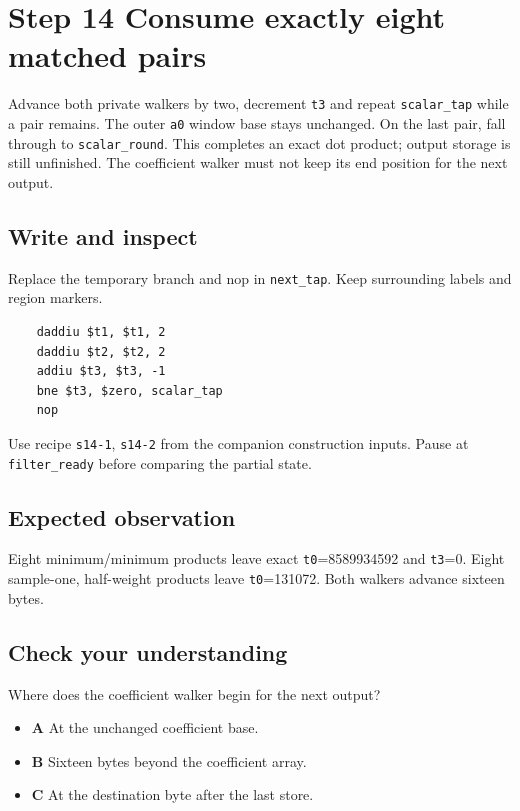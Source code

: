 \section{Step 14 Consume exactly eight matched pairs}\label{fir-s14}

Advance both private walkers by two, decrement \texttt{t3} and repeat \texttt{scalar\_tap} while a pair remains. The outer \texttt{a0} window base stays unchanged. On the last pair, fall through to \texttt{scalar\_round}. This completes an exact dot product; output storage is still unfinished. The coefficient walker must not keep its end position for the next output.

\subsection{Write and inspect}
Replace the temporary branch and nop in \texttt{next\_tap}. Keep surrounding labels and region markers.

\begin{verbatim}
    daddiu $t1, $t1, 2
    daddiu $t2, $t2, 2
    addiu $t3, $t3, -1
    bne $t3, $zero, scalar_tap
    nop
\end{verbatim}
Use recipe \texttt{s14-1}, \texttt{s14-2} from the companion construction inputs. Pause at \texttt{filter\_ready} before comparing the partial state.

\subsection{Expected observation}
Eight minimum/minimum products leave exact \texttt{t0}=8589934592 and \texttt{t3}=0. Eight sample-one, half-weight products leave \texttt{t0}=131072. Both walkers advance sixteen bytes.

\subsection{Check your understanding}
Where does the coefficient walker begin for the next output?

\begin{itemize}
\item \textbf{A} At the unchanged coefficient base.
\item \textbf{B} Sixteen bytes beyond the coefficient array.
\item \textbf{C} At the destination byte after the last store.
\end{itemize}
